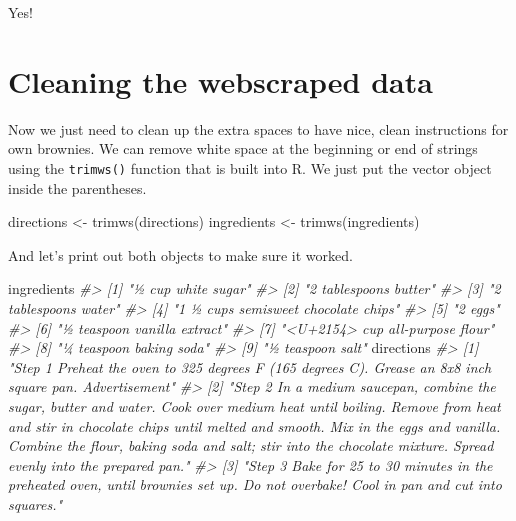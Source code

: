 \documentclass[
]{krantz}
\makeatletter
\newenvironment{Shaded}{\begin{snugshade}}{\end{snugshade}}
\newcommand{\CommentTok}[1]{\textcolor[rgb]{0.37,0.37,0.37}{\textit{#1}}}
\newcommand{\FunctionTok}[1]{\textcolor[rgb]{0,0,0}{#1}}
\newcommand{\NormalTok}[1]{#1}
\newcommand{\OtherTok}[1]{\textcolor[rgb]{0.37,0.37,0.37}{#1}}
\newenvironment{kframe}{%
\medskip{}
\setlength{\fboxsep}{.8em}
 \def\at@end@of@kframe{}%
 \ifinner\ifhmode%
  \def\at@end@of@kframe{\end{minipage}}%
  \begin{minipage}{\columnwidth}%
 \fi\fi%
 \def\FrameCommand##1{\hskip\@totalleftmargin \hskip-\fboxsep
 \colorbox{shadecolor}{##1}\hskip-\fboxsep
     \hskip-\linewidth \hskip-\@totalleftmargin \hskip\columnwidth}%
 \MakeFramed {\advance\hsize-\width
   \@totalleftmargin\z@ \linewidth\hsize
   \@setminipage}}%
 {\par\unskip\endMakeFramed%
 \at@end@of@kframe}
\renewenvironment{Shaded}{\begin{kframe}}{\end{kframe}}
\makeatother
\begin{document}
Yes!

\hypertarget{cleaning-the-webscraped-data}{%
\section{Cleaning the webscraped data}\label{cleaning-the-webscraped-data}}

Now we just need to clean up the extra spaces to have nice, clean instructions for own brownies. We can remove white space at the beginning or end of strings using the \texttt{trimws()} function that is built into R. We just put the vector object inside the parentheses.

\begin{Shaded}
\begin{Highlighting}[]
\NormalTok{directions  }\OtherTok{\textless{}{-}} \FunctionTok{trimws}\NormalTok{(directions)}
\NormalTok{ingredients }\OtherTok{\textless{}{-}} \FunctionTok{trimws}\NormalTok{(ingredients)}
\end{Highlighting}
\end{Shaded}

And let's print out both objects to make sure it worked.

\begin{Shaded}
\begin{Highlighting}[]
\NormalTok{ingredients}
\CommentTok{\#\textgreater{} [1] "½ cup white sugar"                 }
\CommentTok{\#\textgreater{} [2] "2 tablespoons butter"              }
\CommentTok{\#\textgreater{} [3] "2 tablespoons water"               }
\CommentTok{\#\textgreater{} [4] "1 ½ cups semisweet chocolate chips"}
\CommentTok{\#\textgreater{} [5] "2 eggs"                            }
\CommentTok{\#\textgreater{} [6] "½ teaspoon vanilla extract"        }
\CommentTok{\#\textgreater{} [7] "\textless{}U+2154\textgreater{} cup all{-}purpose flour"    }
\CommentTok{\#\textgreater{} [8] "¼ teaspoon baking soda"            }
\CommentTok{\#\textgreater{} [9] "½ teaspoon salt"}
\NormalTok{directions}
\CommentTok{\#\textgreater{} [1] "Step 1   Preheat the oven to 325 degrees F (165 degrees C). Grease an 8x8 inch square pan.    Advertisement"                                                                                                                                                                                                               }
\CommentTok{\#\textgreater{} [2] "Step 2   In a medium saucepan, combine the sugar, butter and water. Cook over medium heat until boiling. Remove from heat and stir in chocolate chips until melted and smooth. Mix in the eggs and vanilla. Combine the flour, baking soda and salt; stir into the chocolate mixture. Spread evenly into the prepared pan."}
\CommentTok{\#\textgreater{} [3] "Step 3   Bake for 25 to 30 minutes in the preheated oven, until brownies set up. Do not overbake! Cool in pan and cut into squares."}
\end{Highlighting}
\end{Shaded}
\end{document}
